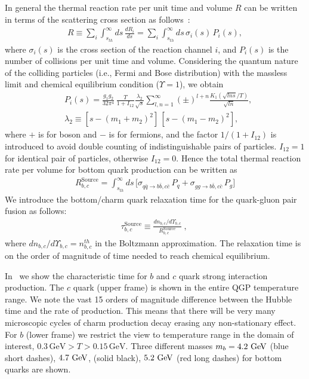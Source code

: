 In general the thermal reaction rate per unit time and volume $R$ can be written in terms of the scattering cross section as follows~\cite{Letessier:2002ony}:
\begin{align}
R\equiv\sum_i\int_{s_{th}}^\infty\!ds\,\frac{dR_i}{ds}=\sum_i\int_{s_{th}}^\infty\!ds\,\sigma_i(s)\,P_i(s),
\end{align}
where $\sigma_i(s)$ is the cross section of the reaction channel $i$, and $P_i(s)$ is the number of collisions per unit time and volume. Considering the quantum nature of the colliding particles (i.e., Fermi and Bose distribution)  with the massless limit and chemical equilibrium condition ($\Upsilon=1$), we obtain~\cite{Letessier:2002ony}
\begin{align}
&P_i(s)=\frac{g_1g_2}{32\pi^4}\,\frac{T}{1+I_{12}}\frac{\lambda_2}{\sqrt{s}}\!\sum_{l,n=1}^{\infty}\!(\pm)^{l+n}\frac{K_1(\sqrt{lns}/T)}{\sqrt{ln}},\\
&\lambda_2\equiv\left[s-\left(m_1+m_2\right)^2\right]\,\left[s-\left(m_1-m_2\right)^2\right],
\end{align}
where $+$ is for boson and $-$ is for fermions, and the factor $1/(1+I_{12})$ is introduced to avoid double counting of indistinguishable pairs of particles. $I_{12}=1$ for identical pair of particles, otherwise $I_{12}=0$. Hence the total thermal reaction rate per volume for bottom quark production can be written as
\begin{align}
\label{Bquark_Source}
R^{\mathrm{Source}}_{b,c}=\int^\infty_{s_{th}}ds\,\bigg[\sigma_{q\bar{q}\rightarrow b\bar{b},c\bar{c}}\,P_q+\sigma_{gg\rightarrow b\bar{b},c\bar{c}}\,P_g\bigg]%
\end{align}
We introduce the bottom/charm quark relaxation time for the quark-gluon pair fusion as follows:
\begin{align}
\label{relaxation_time}
&{\tau_{b,c}^{\mathrm{Source}}}\equiv\frac{dn_{b,c}/d\Upsilon_{b,c}}{R^{\mathrm{Source}}_{b,c}}\;,\quad
\end{align}
where $dn_{b,c}/d\Upsilon_{b,c}=n^{th}_{b,c}$ in the Boltzmann approximation. The relaxation time is on the order of magnitude of time needed to reach chemical equilibrium. 

In~ we show the characteristic time for $b$ and $c$ quark strong interaction production. The $c$ quark (upper frame) is shown in the entire QGP temperature range. We note the vast 15 orders of magnitude difference between the Hubble time and the rate of production. This means that there will be very many microscopic cycles of charm production decay erasing any non-stationary effect.  For $b$ (lower frame) we restrict the view to temperature range in the domain of interest, $ 0.3\,\mathrm{GeV}>T> 0.15\,\mathrm{GeV}$. Three different masses $m_{b}=4.2\text{ GeV}$ (blue short dashes), $4.7\text{ GeV}$, (solid black), $5.2\text{ GeV}$ (red long dashes) for bottom quarks are shown. 
 
